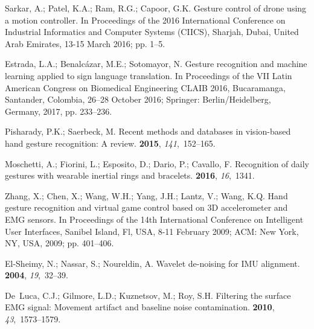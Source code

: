 \documentclass[sensors,review,accept,moreauthors,pdftex]{Definitions/mdpi}
\begin{document}
\begin{thebibliography}{999}
Sarkar, A.; Patel, K.A.; Ram, R.G.; Capoor, G.K.
\newblock Gesture control of drone using a motion controller.
In {Proceedings of the 2016 International Conference on Industrial Informatics and Computer Systems (CIICS),} Sharjah, Dubai, United Arab Emirates, 13-15 March 2016; pp. 1--5.

Estrada, L.A.; Benalc{\'a}zar, M.E.; Sotomayor, N.
\newblock Gesture recognition and machine learning applied to sign language
  translation.
In {Proceedings of the }  VII Latin American Congress on Biomedical Engineering CLAIB 2016,
  Bucaramanga, Santander, Colombia,  26--28 October 2016; Springer:  Berlin/Heidelberg, Germany,   2017,
  pp. 233--236.

Pisharady, P.K.; Saerbeck, M.
\newblock Recent methods and databases in vision-based hand gesture
  recognition: A review.
 {\bf 2015}, {\em
  141},~152--165.

Moschetti, A.; Fiorini, L.; Esposito, D.; Dario, P.; Cavallo, F.
\newblock Recognition of daily gestures with wearable inertial rings and
  bracelets.
 {\bf 2016}, {\em 16},~1341.

Zhang, X.; Chen, X.; Wang, W.H.; Yang, J.H.; Lantz, V.; Wang, K.Q.
\newblock Hand gesture recognition and virtual game control based on 3D
  accelerometer and EMG sensors.
In   Proceedings of the 14th International Conference on Intelligent User
  Interfaces, Sanibel Island, Fl, USA, 8-11 February 2009;  ACM:  New York, NY, USA, 2009; pp. 401--406.

El-Sheimy, N.; Nassar, S.; Noureldin, A.
\newblock Wavelet de-noising for IMU alignment.
 {\bf 2004}, {\em
  19},~32--39.

De~Luca, C.J.; Gilmore, L.D.; Kuznetsov, M.; Roy, S.H.
\newblock Filtering the surface EMG signal: Movement artifact and baseline
  noise contamination.
 {\bf 2010}, {\em 43},~1573--1579.


\end{thebibliography}
\end{document}
